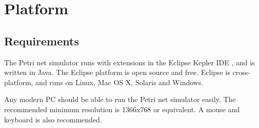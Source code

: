\section{Platform}

\subsection{Requirements}
The Petri net simulator runs with extensions in the Eclipse Kepler IDE , and is written in Java. The Eclipse platform is open source and free. Eclipse is cross-platform, and runs on Linux, Mac OS X, Solaris and Windows. 

Any modern PC should be able to run the Petri net simulator easily. The recommended minimum resolution is 1366x768 or equivalent. A mouse and keyboard is also recommended.